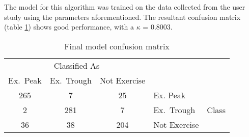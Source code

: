 The model for this algorithm was trained on the data collected from the user study using the parameters aforementioned. The resultant confusion matrix (table \ref{tab:final-confusion}) shows good performance, with a $\kappa$ = 0.8003.

\begin{table}
	\centering
	\begin{tabular}{|ccc|ll|}
		\hline
		\multicolumn{3}{|c|}{Classified As}   &          &                        \\
		Ex.~Peak & Ex.~Trough & Not Exercise &          &                        \\
		\hline
		265       & 7     & 25      & Ex. Peak & \multirow{3}{*}{Class} \\
		2        & 281    & 7      & Ex.~Trough    &                        \\
		36        & 38     & 204     & Not Exercise   &                        \\
		\hline
	\end{tabular}
	\caption{Final model confusion matrix \label{tab:final-confusion}}
\end{table}